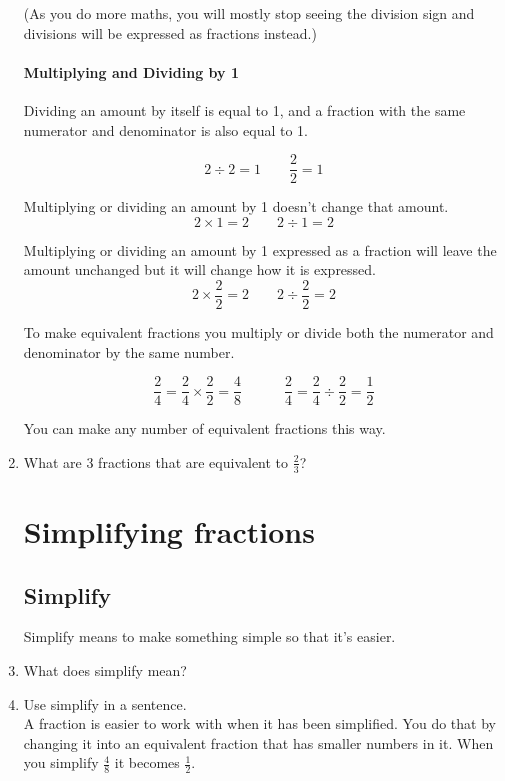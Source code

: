 \documentclass[14pt]{article}
\begin{document}
\begin{enumerate}
(As you do more maths, you will mostly stop seeing the division sign and divisions will be expressed as fractions instead.)

\paragraph{Multiplying and Dividing by 1}
Dividing an amount by itself is equal to 1, and a fraction with the same numerator and denominator is also equal to 1.

$$2\div2=1 \hspace{2em} \frac{2}{2}=1$$
 
Multiplying or dividing an amount by 1 doesn't change that amount. 
$$2\times1=2 \hspace{2em} 2\div1=2$$

Multiplying or dividing an amount by 1 expressed as a fraction will leave the amount unchanged but it will change how it is expressed.
$$2\times\frac{2}{2}=2 \hspace{2em} 2\div\frac{2}{2}=2$$
 
To make equivalent fractions you multiply or divide both the numerator and denominator by the same number.

$$\frac{2}{4} = \frac{2}{4}\times\frac{2}{2} = \frac{4}{8} \hspace{3em} \frac{2}{4} = \frac{2}{4}\div\frac{2}{2} = \frac{1}{2}$$

You can make any number of equivalent fractions this way.\\

\item What are 3 fractions that are equivalent to $\frac{2}{3}$?

\newpage

\section{Simplifying fractions}

\subsection*{Simplify} Simplify means to make something simple so that it's easier.

\item What does simplify mean?
\item Use simplify in a sentence.\\

A fraction is easier to work with when it has been simplified. You do that by changing it into an equivalent fraction that has smaller numbers in it. When you simplify $\frac{4}{8}$ it becomes $\frac{1}{2}$.\\


\end{enumerate}
\end{document}
